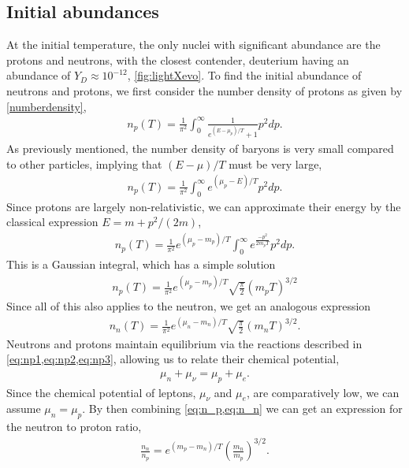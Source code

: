 \subsection{Initial abundances}
At the initial temperature, the only nuclei with significant abundance are the protons and neutrons, with the closest contender, deuterium having an abundance of $Y_D\approx 10^{-12}$, \cref{fig:lightXevo}. 
To find the initial abundance of neutrons and protons, we first consider the number density of protons as given by \cref{numberdensity}, 
\begin{align}
    n_p(T)=\frac{1}{\pi^2}\int_{0}^{\infty}\frac{1}{e^{(E-\mu_p)/T}+1} p^2 dp.
\end{align}
As previously mentioned, the number density of baryons is very small compared to other particles, implying that $(E-\mu)/T$ must be very large,
\begin{align}
    n_p(T)=\frac{1}{\pi^2}\int_{0}^{\infty}{e^{(\mu_p-E)/T}} p^2 dp.
\end{align}
Since protons are largely non-relativistic, we can approximate their energy by the classical expression $E=m+p^2/(2m)$, 
\begin{align}
    n_p(T)=\frac{1}{\pi^2}e^{(\mu_p-m_p)/T}\int_{0}^{\infty}{e^{\frac{-p^2}{2m_pT}}} p^2 dp.
\end{align}
This is a Gaussian integral, which has a simple solution\cite{griffiths_introduction_2018}
\begin{align}
    n_p(T)=\frac{1}{\pi^2} e^{(\mu_p-m_p)/T} \sqrt{\frac{\pi}{2}}\left( { m_p T} \right)^{3/2}
    \label{eq:n_p}
\end{align}
Since all of this also applies to the neutron, we get an analogous expression
\begin{align}
    n_n(T)=\frac{1}{\pi^2} e^{(\mu_n-m_n)/T} \sqrt{\frac{\pi}{2}}\left( { m_n T} \right)^{3/2}.
    \label{eq:n_n}
\end{align}
Neutrons and protons maintain equilibrium via the reactions described in \cref{eq:np1,eq:np2,eq:np3}, allowing us to relate their chemical potential,
\begin{align}
    \mu_n+\mu_\nu=\mu_p+\mu_e.
\end{align}
Since the chemical potential of leptons, $\mu_\nu$ and $\mu_e$, are comparatively low\cite{kolbturner}, we can assume $\mu_n=\mu_p$. By then combining \cref{eq:n_p,eq:n_n} we can get an expression for the neutron to proton ratio,
\begin{align}
    \frac{n_n}{n_p}=e^{(m_p-m_n)/T} \left( \frac{m_n}{ m_p} \right)^{3/2}.
    \label{eq:nnnp}
\end{align}
